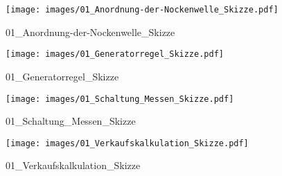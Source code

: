 %
%
%
\begin{figure}[!hb]%
    \centering
  \texttt{[image: images/01\_Anordnung-der-Nockenwelle\_Skizze.pdf]}%
  \caption{01_Anordnung-der-Nockenwelle_Skizze}%
\end{figure}

%
%
\begin{figure}[!hb]%
    \centering
  \texttt{[image: images/01\_Generatorregel\_Skizze.pdf]}%
  \caption{01_Generatorregel_Skizze}%
\end{figure}

%
%
\begin{figure}[!hb]%
    \centering
  \texttt{[image: images/01\_Schaltung\_Messen\_Skizze.pdf]}%
  \caption{01_Schaltung_Messen_Skizze}%
\end{figure}

%
%
\begin{figure}[!hb]%
    \centering
  \texttt{[image: images/01\_Verkaufskalkulation\_Skizze.pdf]}%
  \caption{01_Verkaufskalkulation_Skizze}%
\end{figure}


